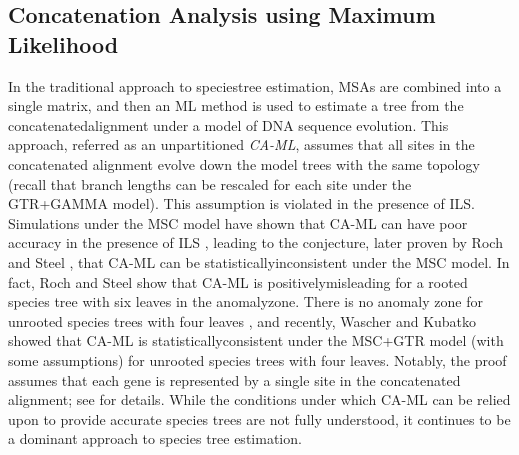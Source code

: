 \subsection{Concatenation Analysis using Maximum Likelihood}
\label{sec:models-caml}
In the traditional approach to \gls{speciestree} estimation, \glspl{MSA} are combined into a single matrix, and then an \gls{ML} method is used to estimate a tree from the \gls{concatenatedalignment} under a model of DNA sequence evolution.
This approach, referred as an unpartitioned \textit{\gls{CA-ML}}, assumes that all \glspl{site} in the concatenated alignment evolve down the model trees with the same topology (recall that branch lengths can be rescaled for each site under the \gls{GTR+GAMMA} model).
This assumption is violated in the presence of \gls{ILS}.
Simulations under the \gls{MSC} model have shown that CA-ML can have poor accuracy in the presence of ILS \cite{kubatko2007inconsistency}, leading to the conjecture, later proven by Roch and Steel \cite{roch2015likelihood}, that CA-ML can be \gls{statisticallyinconsistent} under the MSC model.
In fact, Roch and Steel \cite{roch2015likelihood} show that CA-ML is \gls{positivelymisleading} for a \gls{rooted} species tree with six leaves in the \gls{anomalyzone}.
There is no anomaly zone for \gls{unrooted} species trees with four leaves \cite{allman2011identifying}, and recently, Wascher and Kubatko \cite{wascher2015consistency} showed that CA-ML is \gls{statisticallyconsistent} under the \gls{MSC+GTR} model (with some assumptions) for unrooted species trees with four leaves.
Notably, the proof assumes that each gene is represented by a single site in the concatenated alignment; see \cite{wascher2015consistency} for details.
While the conditions under which CA-ML can be relied upon to provide accurate species trees are not fully understood, it continues to be a dominant approach to species tree estimation.

